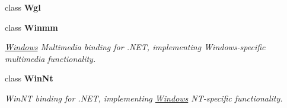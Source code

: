 \begin{DoxyCompactItemize}
class {\bfseries Wgl}
\item 
class {\bfseries Winmm}
\begin{DoxyCompactList}\small\item\em \hyperlink{namespace_tao_1_1_platform_1_1_windows}{Windows} Multimedia binding for .NET, implementing Windows-\/specific multimedia functionality. \item\end{DoxyCompactList}\item 
class {\bfseries WinNt}
\begin{DoxyCompactList}\small\item\em WinNT binding for .NET, implementing \hyperlink{namespace_tao_1_1_platform_1_1_windows}{Windows} NT-\/specific functionality. \item\end{DoxyCompactList}\end{DoxyCompactItemize}
